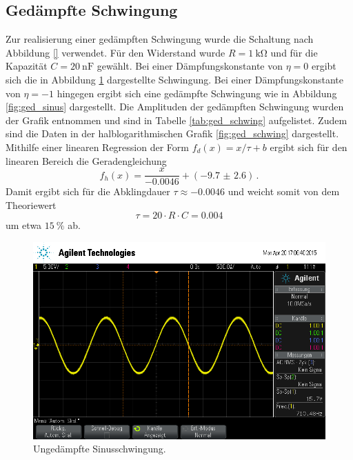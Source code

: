 \subsection{Gedämpfte Schwingung} %
\label{sub:subsection_name}

Zur realisierung einer gedämpften Schwingung wurde die Schaltung nach Abbildung \ref{} verwendet.
Für den Widerstand wurde $R = \SI{1}{\kilo\ohm}$ und für die Kapazität $C = \SI{20}{\nano\farad}$ gewählt.
Bei einer Dämpfungskonstante von $\eta = 0$ ergibt sich die in Abbildung \ref{fig:unged_sinus} dargestellte Schwingung.
Bei einer Dämpfungskonstante von $\eta = -1$ hingegen ergibt sich eine gedämpfte Schwingung wie in Abbildung \ref{fig:ged_sinus} dargestellt.
Die Amplituden der gedämpften Schwingung wurden der Grafik entnommen und sind in Tabelle \ref{tab:ged_schwing} aufgelistet.
Zudem sind die Daten in der halblogarithmischen Grafik \ref{fig:ged_schwing} dargestellt.
Mithilfe einer linearen Regression der Form $f_{d}(x) = x / \tau + b$ ergibt sich für den linearen Bereich die Geradengleichung
\begin{equation*}
    f_h(x) = \frac{x}{\num{-0.0046}} + (\num{-9.7(26)})\,.
\end{equation*}
Damit ergibt sich für die Abklingdauer $\tau \approx \num{-0.0046}$ und weicht somit von dem Theoriewert
\begin{equation*}
    \tau = 20 \cdot R \cdot C = 0.004
\end{equation*}
um etwa $\SI{15}{\percent}$ ab.

\begin{figure}[!h]
    \centering
    \includegraphics[width=0.8\linewidth]{data/scope_16.png}
    \caption{Ungedämpfte Sinusschwingung.}
    \label{fig:unged_sinus}
\end{figure}

